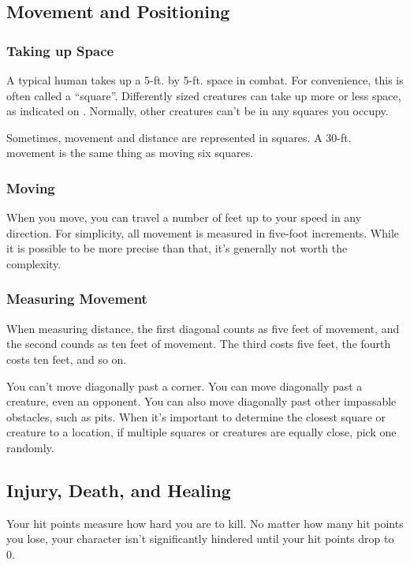 \subsection{Movement and Positioning}\label{Movement and Positioning}

\subsubsection{Taking up Space}
A typical human takes up a 5-ft. by 5-ft. space in combat. For convenience, this is often called a ``square''. Differently sized creatures can take up more or less space, as indicated on . Normally, other creatures can't be in any squares you occupy.

Sometimes, movement and distance are represented in squares. A 30-ft. movement is the same thing as moving six squares.

\subsubsection{Moving}

When you move, you can travel a number of feet up to your speed in any direction. For simplicity, all movement is measured in five-foot increments. While it is possible to be more precise than that, it's generally not worth the complexity.

\subsubsection{Measuring Movement}

 When measuring distance, the first diagonal counts as five feet of movement, and the second counds as ten feet of movement. The third costs five feet, the fourth costs ten feet, and so on.

You can't move diagonally past a corner. You can move diagonally past a creature, even an opponent. You can also move diagonally past other impassable obstacles, such as pits.
 When it's important to determine the closest square or creature to a location, if multiple squares or creatures are equally close, pick one randomly.

\subsection{Injury, Death, and Healing}\label{Injury, Death, and Healing}
Your hit points measure how hard you are to kill. No matter how many hit points you lose, your character isn't significantly hindered until your hit points drop to 0.

